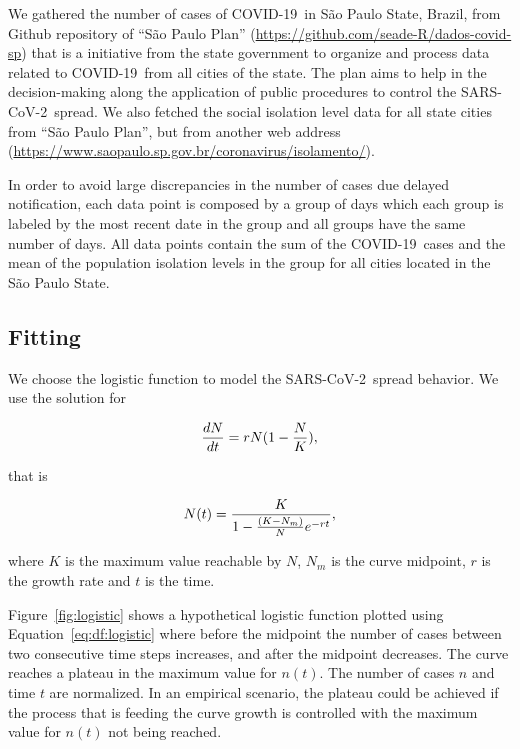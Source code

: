 \documentclass[times]{article}
\def\covid{\hbox{COVID-19}} %
\def\sarscov{{SARS-CoV-2}}
\def\eq#1{Equation~#1}
\def\fig#1{Figure~#1}
\begin{document}
We gathered the number of cases of \covid\ 
in S\~{a}o Paulo State, Brazil, 
from Github repository of ``S\~{a}o Paulo Plan'' 
(\url{https://github.com/seade-R/dados-covid-sp}) 
that is a initiative from the state government 
to organize and process data related to \covid \
from all cities of the state. 
The plan aims to help in the decision-making 
along the application of public 
procedures to control the \sarscov\ spread. 
We also fetched the social isolation level data 
for all state cities  from 
``S\~{a}o Paulo Plan'', but from another web address 
(\url{https://www.saopaulo.sp.gov.br/coronavirus/isolamento/}).

In order to avoid large discrepancies 
in the number of cases due delayed notification, 
 each data point is composed by a group of days 
 which each group is labeled by the most 
 recent date in the group and 
 all groups have the same number of days. 
 All data points contain 
 the sum of the \covid\ cases and 
 the mean of the population isolation levels 
 in the group for all cities 
 located in the S\~{a}o Paulo State.

\subsection{Fitting}

We choose the logistic function to model 
the \sarscov\ spread behavior. We use the 
solution for

\begin{equation}
{dN \over dt} = r N (1 - {N \over K}),
\label{eq:df:logistic}
\end{equation}

\noindent that is

\begin{equation}
N(t) = {K \over {1- {(K-N_{m}) \over N} e^{-rt}}},
\label{eq:exp:logistic}
\end{equation}

\noindent where $K$ is the maximum value reachable by $N$, 
$N_m$ is the curve midpoint, 
$r$ is the growth rate 
and $t$ is the time.

\fig{\ref{fig:logistic}} shows a hypothetical logistic function 
plotted using \eq{\ref{eq:df:logistic}} where before the midpoint 
the number of cases between 
two consecutive time steps increases, 
and after the midpoint decreases. 
The curve reaches a plateau in the maximum value for $n(t)$. 
The number of cases $n$ and time $t$ are normalized.
In an empirical scenario, the plateau could be achieved 
if the process that is feeding the curve 
growth is controlled with the maximum 
value for $n(t)$ not being reached.
\end{document}
